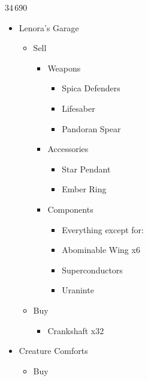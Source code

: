 \begin{multicols}{2}
  \begin{shop}{34\,690}
    \begin{itemize}
      \item Lenora's Garage
            \begin{itemize}
              \item Sell
                    \begin{itemize}
                      \item Weapons
                            \begin{itemize}
                              \item Spica Defenders
                              \item Lifesaber
                              \item Pandoran Spear
                            \end{itemize}
                      \item Accessories
                            \begin{itemize}
                              \item Star Pendant
                              \item Ember Ring
                            \end{itemize}
                      \item Components
                            \begin{itemize}
                              \item Everything except for:
                              \item Abominable Wing x6
                              \item Superconductors
                              \item Uraninte
                            \end{itemize}
                    \end{itemize}
              \item Buy
                    \begin{itemize}
                      \item Crankshaft x32
                    \end{itemize}
            \end{itemize}
      \item Creature Comforts
            \begin{itemize}
              \item Buy
                    \begin{itemize}

\end{itemize}
\end{itemize}
\end{itemize}
\end{shop}
\end{multicols}
